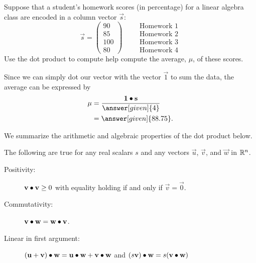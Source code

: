 \documentclass{ximera}
\begin{document}
\begin{example}
  Suppose that a student's homework scores (in percentage) for a
  linear algebra class are encoded in a column vector $\vec{s}$:
  \[
    \vec{s} =
    \begin{pmatrix}
      90 \\ 85 \\ 100 \\ 80
    \end{pmatrix}
    \qquad
    \begin{array}{l}
      \text{Homework 1}\\
      \text{Homework 2}\\
      \text{Homework 3}\\
      \text{Homework 4}
    \end{array}
    \]
    Use the dot product to compute help compute the average, $\mu$, of
    these scores.
  \begin{explanation}
   Since we can simply dot our vector with the vector $\vec{1}$ to sum
   the data, the average can be expressed by
    \begin{align*}
      \mu
      & = \frac{\vec{1} \dotp \vec{s}}{\answer[given]{4}}\\
      &=\answer[given]{88.75}.
    \end{align*}
  \end{explanation}
\end{example}






We summarize the arithmetic and algebraic properties of the dot
product below.
\begin{theorem}
  The following are true for any real scalars $s$ and any vectors
  $\vec{u}$, $\vec{v}$, and $\vec{w}$ in $\mathbb{R}^n$.
  \begin{description}
  \item[Positivity:] $\mathbf{v} \bullet \mathbf{v} \ge 0$ with equality holding
    if and only if $\vec{v} = \vec{0}$.
  \item[Commutativity:] $\mathbf{v} \bullet \mathbf{w} = \mathbf{w} \bullet
    \mathbf{v}$.
  \item[Linear in first argument:] $(\mathbf{u}+\mathbf{v})\bullet \mathbf{w} = \mathbf{u}\bullet \mathbf{w} +
    \mathbf{v}\bullet \mathbf{w}$ and $(s\mathbf{v})\bullet \mathbf{w} = s(\mathbf{v}
    \bullet \mathbf{w})$
  \end{description}
\end{theorem}
\end{document}
